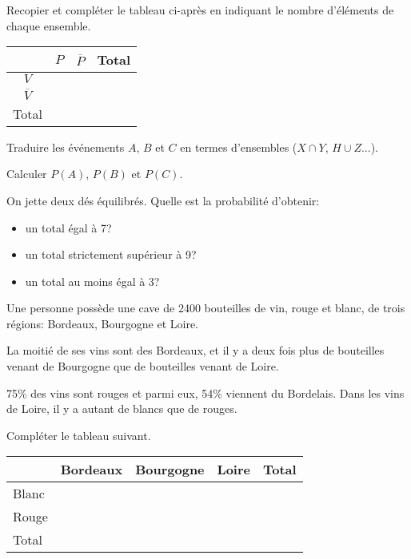 \documentclass[a4paper,12pt]{scrartcl}
\begin{document}
\question{}
Recopier et compléter le tableau ci-après en indiquant le nombre d'éléments de chaque ensemble.

\begin{center}
    \begin{tabular}{|c|c|c|c|}
        \hline
        & $P$ & $\overline{P}$ & Total \\ \hline
        $V$            &  \hspace{2cm}   &  \hspace{2cm}   &   \hspace{2cm}    \\ \hline
        $\overline{V}$ &     &     &       \\ \hline
        Total          &     &     &    \\ \hline
    \end{tabular}
\end{center}



\question{}
Traduire les événements $A$, $B$ et $C$ en termes d'ensembles ($X \cap Y$, $H \cup Z$...).

\question{}
Calculer $P(A)$, $P(B)$ et $P(C)$.

On jette deux dés équilibrés. Quelle est la probabilité d'obtenir:

\begin{itemize}
 \item un total égal à 7?
 \item un total strictement supérieur à 9?
 \item un total au moins égal à 3?
\end{itemize}


Une personne possède une cave de 2400 bouteilles de vin, rouge et blanc, de trois régions: Bordeaux, Bourgogne et Loire.

La moitié de ses vins sont des Bordeaux, et il y a deux fois plus de bouteilles venant de Bourgogne que de bouteilles venant de Loire.

75\% des vins sont rouges et parmi eux, 54\% viennent du Bordelais. Dans les vins de Loire, il y a autant de blancs que de rouges.

\question{}
Compléter le tableau suivant.

\begin{center}
    \begin{tabular}{|l|l|l|l|l|}
        \hline
        & Bordeaux & Bourgogne & Loire & Total \\ \hline
        Blanc &     \hspace{2cm}     &      \hspace{2cm}     &   \hspace{2cm}    &   \hspace{2cm}    \\ \hline
        Rouge &          &           &       &       \\ \hline
        Total &          &           &       &       \\ \hline
    \end{tabular}
\end{center}
\end{document}
